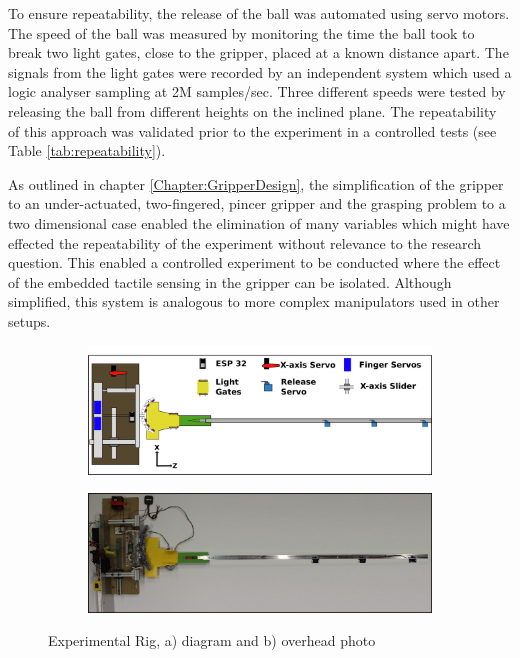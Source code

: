 To ensure repeatability, the release of the ball was automated using servo motors. The speed of the ball was measured by monitoring the time the ball took to break two light gates, close to the gripper, placed at a known distance apart. The signals from the light gates were recorded by an independent system which used a logic analyser sampling at 2M samples/sec. Three different speeds were tested by releasing the ball from different heights on the inclined plane. The repeatability of this approach was validated prior to the experiment in a controlled tests (see Table \ref{tab:repeatability}).

As outlined in chapter \ref{Chapter:GripperDesign}, the simplification of the gripper to an under-actuated, two-fingered, pincer gripper and the grasping problem to a two dimensional case enabled the elimination of many variables which might have effected the repeatability of the experiment without relevance to the research question. This enabled a controlled experiment to be conducted where the effect of the embedded tactile sensing in the gripper can be isolated. Although simplified, this system is analogous to more complex manipulators used in other setups. 

\begin{figure}[ht]
    \centering
    \begin{subfigure}{.8\linewidth}
        \centering
        \includegraphics[width=\textwidth]{Images/FinalRig.png}
        \caption{}
        \label{subfigure:RigDiagram}
    \end{subfigure}
    \begin{subfigure}{.8\linewidth}
        \centering
    \includegraphics[width=\textwidth]{Images/RIG.png}
        \caption{}
        \label{subfigure:RigPhoto}
    \end{subfigure}
    \caption{Experimental Rig, a) diagram and b) overhead photo}
\label{fig:FullRig}
\end{figure}

